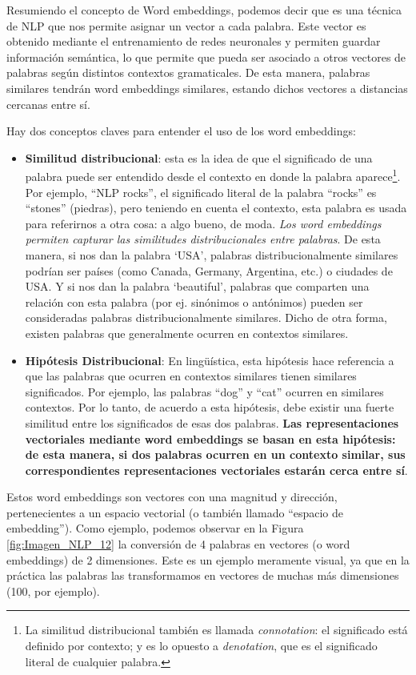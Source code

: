\documentclass[12pt,a4paper]{article}
\begin{document}
\begin{sloppypar}
Resumiendo el concepto de Word embeddings, podemos decir que es una técnica de NLP que nos permite asignar un vector a cada palabra. Este vector es obtenido mediante el entrenamiento de redes neuronales y permiten guardar información semántica, lo que permite que pueda ser asociado a otros vectores de palabras según distintos contextos gramaticales. De esta manera, palabras similares tendrán word embeddings similares, estando dichos vectores a distancias cercanas entre sí.

Hay dos conceptos claves para entender el uso de los word embeddings:
\begin{itemize}
\item \textbf{Similitud distribucional}\cite{NLP_26}: esta es la idea de que el significado de una palabra puede ser entendido desde el contexto en donde la palabra aparece\footnote{La similitud distribucional también es llamada \textit{connotation}: el significado está definido por contexto; y es lo opuesto a \textit{denotation}, que es el significado literal de cualquier palabra.}. Por ejemplo, “NLP rocks”, el significado literal de la palabra “rocks” es “stones” (piedras), pero teniendo en cuenta el contexto, esta palabra es usada para referirnos a otra cosa: a algo bueno, de moda. \textit{Los word embeddings permiten capturar las similitudes distribucionales entre palabras}. De esta manera, si nos dan la palabra ‘USA’, palabras distribucionalmente similares podrían ser países (como Canada, Germany, Argentina, etc.) o ciudades de USA. Y si nos dan la palabra ‘beautiful’, palabras que comparten una relación con esta palabra (por ej. sinónimos o antónimos) pueden ser consideradas palabras distribucionalmente similares. Dicho de otra forma, existen palabras que generalmente ocurren en contextos similares.
\item \textbf{Hipótesis Distribucional}\cite{NLP_26}: En lingüística, esta hipótesis hace referencia a que las palabras que ocurren en contextos similares tienen similares significados. Por ejemplo, las palabras “dog” y “cat” ocurren en similares contextos. Por lo tanto, de acuerdo a esta hipótesis, debe existir una fuerte similitud entre los significados de esas dos palabras. \textbf{Las representaciones vectoriales mediante word embeddings se basan en esta hipótesis: de esta manera, si dos palabras ocurren en un contexto similar, sus correspondientes representaciones vectoriales estarán cerca entre sí}.  

\end{itemize}

Estos word embeddings son vectores con una magnitud y dirección, pertenecientes a un espacio vectorial (o también llamado “espacio de embedding”). Como ejemplo, podemos observar en la Figura \ref{fig:Imagen_NLP_12} la conversión de 4 palabras en vectores (o word embeddings) de 2 dimensiones. Este es un ejemplo meramente visual, ya que en la práctica las palabras las transformamos en vectores de muchas más dimensiones (100, por ejemplo). 


\end{sloppypar}
\end{document}

